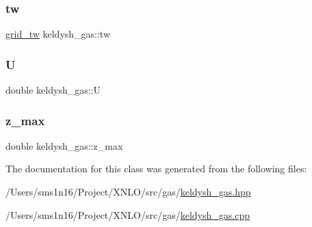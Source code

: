 \mbox{\label{classkeldysh__gas_a1cd7129f9ba9d62f4084049e529cab49}} 
\subsubsection{\texorpdfstring{tw}{tw}}
{\footnotesize\ttfamily \mbox{\hyperlink{classgrid__tw}{grid\+\_\+tw}} keldysh\+\_\+gas\+::tw\hspace{0.3cm}{\ttfamily [private]}}

\mbox{\label{classkeldysh__gas_a752b70afe289a798cc0ab7b688b9ed3d}} 
\subsubsection{\texorpdfstring{U}{U}}
{\footnotesize\ttfamily double keldysh\+\_\+gas\+::U}

\mbox{\label{classkeldysh__gas_a117691dd8b6fd06b34a73392c0e73e32}} 
\subsubsection{\texorpdfstring{z\_max}{z\_max}}
{\footnotesize\ttfamily double keldysh\+\_\+gas\+::z\+\_\+max}



The documentation for this class was generated from the following files\+:\begin{DoxyCompactItemize}
\item 
/\+Users/sms1n16/\+Project/\+X\+N\+L\+O/src/gas/\mbox{\hyperlink{keldysh__gas_8hpp}{keldysh\+\_\+gas.\+hpp}}\item 
/\+Users/sms1n16/\+Project/\+X\+N\+L\+O/src/gas/\mbox{\hyperlink{keldysh__gas_8cpp}{keldysh\+\_\+gas.\+cpp}}\end{DoxyCompactItemize}
